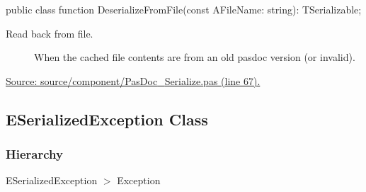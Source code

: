 \documentclass{report}
\newif\ifpdf
\begin{document}
\label{PasDoc_Serialize.TSerializable-DeserializeFromFile}
\begin{list}{}{
\setlength{\itemindent}{0cm}
\setlength{\listparindent}{0cm}
\setlength{\leftmargin}{\evensidemargin}
\addtolength{\leftmargin}{\tmplength}
\settowidth{\labelsep}{X}
\addtolength{\leftmargin}{\labelsep}
\setlength{\labelwidth}{\tmplength}
}
\item[\textbf{Declaration}\hfill]
\ifpdf
\begin{flushleft}
\fi
\begin{ttfamily}
public class function DeserializeFromFile(const AFileName: string): TSerializable;\end{ttfamily}

\ifpdf
\end{flushleft}
\fi

\par
\item[\textbf{Description}]
Read back from file. \par
\item[\textbf{Exceptions}]
\begin{description}
\item[\begin{ttfamily}EInvalidCacheFileVersion\end{ttfamily}(\ref{PasDoc_Serialize.EInvalidCacheFileVersion})] When the cached file contents are from an old pasdoc version (or invalid).
\end{description}
\par
\href{https://github.com/pasdoc/pasdoc/blob/master/source/component/PasDoc_Serialize.pas#L67}{Source: source/component/PasDoc{\_}Serialize.pas (line 67).}

\end{list}
\ifpdf
\subsection*{\large{\textbf{ESerializedException Class}}\normalsize\hspace{1ex}\hrulefill}
\else
\subsection*{ESerializedException Class}
\fi
\label{PasDoc_Serialize.ESerializedException}
\subsubsection*{\large{\textbf{Hierarchy}}\normalsize\hspace{1ex}\hfill}
ESerializedException {$>$} Exception
\end{document}
